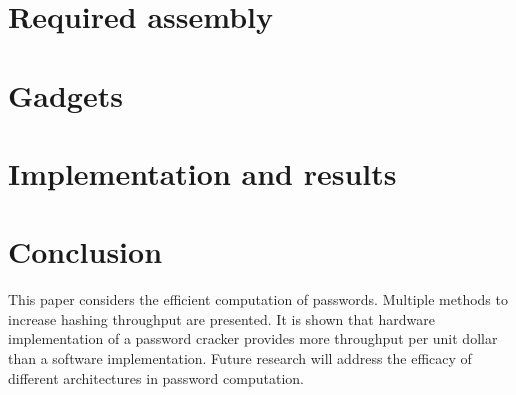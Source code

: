 \section{Required assembly} \label{sec::asm} %


\section{Gadgets} \label{sec::gadget} %



\section{Implementation and results}\label{sec::results} %


\section{Conclusion}\label{sec::conclusion} 


	This paper considers the efficient computation of passwords. Multiple methods to increase hashing throughput are presented. It is shown that hardware implementation of a password cracker provides more throughput per unit dollar than a software implementation. Future research will address the efficacy of different architectures in password computation. 





